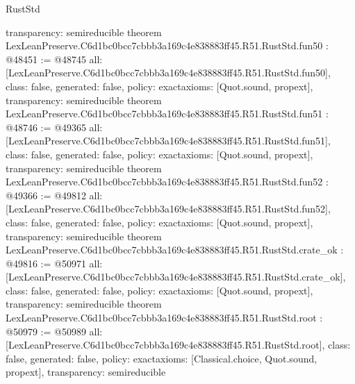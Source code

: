 \begin{lexlean}{RustStd}
\begin{coremodule}
{  transparency: semireducible
}
theorem LexLeanPreserve.C6d1bc0bcc7cbbb3a169c4e838883ff45.R51.RustStd.fun50 : @48451 := @48745 {
  all: [LexLeanPreserve.C6d1bc0bcc7cbbb3a169c4e838883ff45.R51.RustStd.fun50],
  class: false,
  generated: false,
  policy: exact{axioms: [Quot.sound, propext]},
  transparency: semireducible
}
theorem LexLeanPreserve.C6d1bc0bcc7cbbb3a169c4e838883ff45.R51.RustStd.fun51 : @48746 := @49365 {
  all: [LexLeanPreserve.C6d1bc0bcc7cbbb3a169c4e838883ff45.R51.RustStd.fun51],
  class: false,
  generated: false,
  policy: exact{axioms: [Quot.sound, propext]},
  transparency: semireducible
}
theorem LexLeanPreserve.C6d1bc0bcc7cbbb3a169c4e838883ff45.R51.RustStd.fun52 : @49366 := @49812 {
  all: [LexLeanPreserve.C6d1bc0bcc7cbbb3a169c4e838883ff45.R51.RustStd.fun52],
  class: false,
  generated: false,
  policy: exact{axioms: [Quot.sound, propext]},
  transparency: semireducible
}
theorem LexLeanPreserve.C6d1bc0bcc7cbbb3a169c4e838883ff45.R51.RustStd.crate_ok : @49816 := @50971 {
  all: [LexLeanPreserve.C6d1bc0bcc7cbbb3a169c4e838883ff45.R51.RustStd.crate_ok],
  class: false,
  generated: false,
  policy: exact{axioms: [Quot.sound, propext]},
  transparency: semireducible
}
theorem LexLeanPreserve.C6d1bc0bcc7cbbb3a169c4e838883ff45.R51.RustStd.root : @50979 := @50989 {
  all: [LexLeanPreserve.C6d1bc0bcc7cbbb3a169c4e838883ff45.R51.RustStd.root],
  class: false,
  generated: false,
  policy: exact{axioms: [Classical.choice, Quot.sound, propext]},
  transparency: semireducible
}


\end{coremodule}
\end{lexlean}
